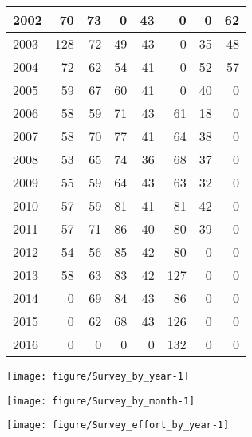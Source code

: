 \documentclass[12pt]{article}\usepackage[]{graphicx}\usepackage[]{color}
\makeatletter
\def\maxwidth{ %
  \ifdim\Gin@nat@width>\linewidth
    \linewidth
  \else
    \Gin@nat@width
  \fi
}
\newenvironment{knitrout}{}{} %
\makeatother
\begin{document}
\begin{knitrout}
\begin{tabular}{l|r|r|r|r|r|r|r}
\hline
2002 & 70 & 73 & 0 & 43 & 0 & 0 & 62\\
\hline
2003 & 128 & 72 & 49 & 43 & 0 & 35 & 48\\
\hline
2004 & 72 & 62 & 54 & 41 & 0 & 52 & 57\\
\hline
2005 & 59 & 67 & 60 & 41 & 0 & 40 & 0\\
\hline
2006 & 58 & 59 & 71 & 43 & 61 & 18 & 0\\
\hline
2007 & 58 & 70 & 77 & 41 & 64 & 38 & 0\\
\hline
2008 & 53 & 65 & 74 & 36 & 68 & 37 & 0\\
\hline
2009 & 55 & 59 & 64 & 43 & 63 & 32 & 0\\
\hline
2010 & 57 & 59 & 81 & 41 & 81 & 42 & 0\\
\hline
2011 & 57 & 71 & 86 & 40 & 80 & 39 & 0\\
\hline
2012 & 54 & 56 & 85 & 42 & 80 & 0 & 0\\
\hline
2013 & 58 & 63 & 83 & 42 & 127 & 0 & 0\\
\hline
2014 & 0 & 69 & 84 & 43 & 86 & 0 & 0\\
\hline
2015 & 0 & 62 & 68 & 43 & 126 & 0 & 0\\
\hline
2016 & 0 & 0 & 0 & 0 & 132 & 0 & 0\\
\hline
\end{tabular}



{\centering \texttt{[image: figure/Survey\_by\_year-1]} 

}



\end{knitrout}

\begin{knitrout}\footnotesize
{}\color{fgcolor}

{\centering \texttt{[image: figure/Survey\_by\_month-1]} 

}



\end{knitrout}

\begin{knitrout}\footnotesize
{}\color{fgcolor}

{\centering \texttt{[image: figure/Survey\_effort\_by\_year-1]} 

}



\end{knitrout}
\end{document}
